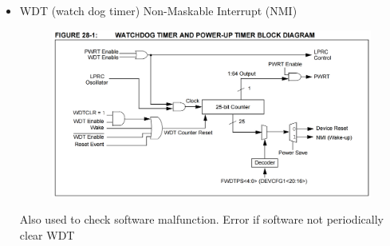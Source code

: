 \documentclass[a4paper]{article}
\begin{document}
\begin{enumerate}[label = \arabic*.]
\begin{itemize}[leftmargin = 1cm]
        \item WDT (watch dog timer) Non-Maskable Interrupt (NMI)
          \begin{figure}[H]
            \centering
            \includegraphics[width=0.8\linewidth]{Watch_dog_timer_block_diagram.png}
            \label{fig:Watch_dog_timer_block_diagram.png}
          \end{figure}

          \par Also used to check software malfunction. Error if software not periodically clear WDT
      \end{itemize}

  \end{enumerate}
\end{document}
